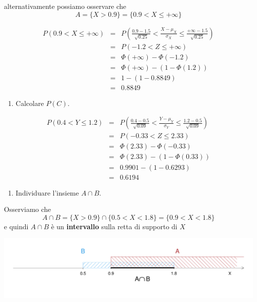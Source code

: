 \documentclass[
  11pt,
]{book}
\providecommand{\tightlist}{%
  \setlength{\itemsep}{0pt}\setlength{\parskip}{0pt}}
\theoremstyle{mytheoremstyle}
\theoremstyle{mydefstyle}
\begin{document}
alternativamente possiamo osservare che
\[A=\{X>0.9\}=\{0.9< X\leq +\infty \}\]

\begin{eqnarray*}
   P( 0.9 < X \leq  +\infty ) &=& P\left( \frac { 0.9  -  1.5 }{\sqrt{ 0.25 }} < \frac { X  -  \mu_X }{ \sigma_X } \leq \frac { +\infty  -  1.5 }{\sqrt{ 0.25 }}\right)  \\
              &=& P\left(  -1.2  < Z \leq  +\infty \right) \\
              &=& \Phi( +\infty )-\Phi( -1.2 )\\
              &=&  \Phi( +\infty )-(1-\Phi( 1.2 )) \\ &=&  1 -(1- 0.8849 ) \\ 
              &=&  0.8849 
   \end{eqnarray*}

\begin{enumerate}
\def\labelenumi{\arabic{enumi}.}
\setcounter{enumi}{2}
\tightlist
\item
  Calcolare \(P(C)\).
\end{enumerate}

\begin{eqnarray*}
   P( 0.4 < Y \leq  1.2 ) &=& P\left( \frac { 0.4  -  0.5 }{\sqrt{ 0.09 }} < \frac { Y  -  \mu_Y }{ \sigma_Y } \leq \frac { 1.2  -  0.5 }{\sqrt{ 0.09 }}\right)  \\
              &=& P\left(  -0.33  < Z \leq  2.33 \right) \\
              &=& \Phi( 2.33 )-\Phi( -0.33 )\\
              &=&  \Phi( 2.33 )-(1-\Phi( 0.33 )) \\ &=&  0.9901 -(1- 0.6293 ) \\ 
              &=&  0.6194 
   \end{eqnarray*}

\begin{enumerate}
\def\labelenumi{\arabic{enumi}.}
\setcounter{enumi}{3}
\tightlist
\item
  Individuare l'insieme \(A\cap B\).
\end{enumerate}

Osserviamo che
\[A\cap B=\{X>0.9\}\cap\{0.5<X<1.8\}= \{0.9<X<1.8\} \]
e quindi \(A\cap B\) è un \textbf{intervallo} sulla retta di supporto di \(X\)

\begin{center}\includegraphics{Appunti_di_Statistica_2025_files/figure-latex/07d-Esercizi-Normale-5-1} \end{center}
\end{document}
